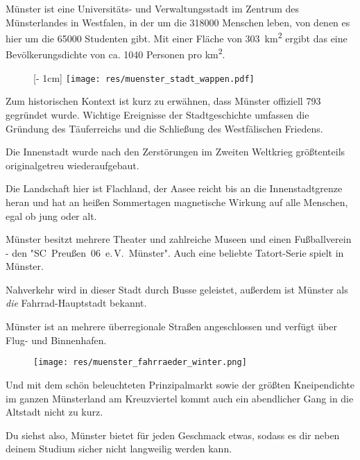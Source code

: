 \begin{multicols}{2}
Münster ist eine Universitäts- und Verwaltungsstadt im Zentrum des Münsterlandes in Westfalen, in der um die \num{318000} Menschen leben, von denen es hier um die \num{65000} Studenten gibt.
Mit einer Fläche von \SI{303}{\km\squared} ergibt das eine Bevölkerungsdichte von ca. \num{1040} Personen pro \si{\km\squared}.

\setlength{\intextsep}{0cm}
{%
\setlength{\columnsep}{2mm}
\begin{wrapfigure}[6]{r}[2mm]{0cm}
	\raisebox{0pt}[\dimexpr\height - 1cm\relax]{%
		\texttt{[image: res/muenster\_stadt\_wappen.pdf]}%
	}
\end{wrapfigure}
Zum historischen Kontext ist kurz zu erwähnen, dass Münster offiziell 793 gegründet wurde.
Wichtige Ereignisse der Stadtgeschichte umfassen die Gründung des Täuferreichs und die Schließung des Westfälischen Friedens.\par}

Die Innenstadt wurde nach den Zerstörungen im Zweiten Weltkrieg größtenteils originalgetreu wiederaufgebaut.

Die Landschaft hier ist Flachland, der Aasee reicht bis an die Innenstadtgrenze heran und hat an heißen Sommertagen magnetische Wirkung auf alle Menschen, egal ob jung oder alt.

Münster besitzt mehrere Theater und zahlreiche Museen und einen Fußballverein - den "SC~Preußen~06~e.\,V.~Münster".
Auch eine beliebte Tatort-Serie spielt in Münster.

Nahverkehr wird in dieser Stadt durch Busse geleistet, außerdem ist Münster als \textit{die} Fahrrad-Hauptstadt bekannt. 

Münster ist an mehrere überregionale Straßen angeschlossen und verfügt über Flug- und Binnenhafen.

\setlength{\columnsep}{2mm}
\begin{wrapfigure}[9]{l}[1mm]{0cm}
	\texttt{[image: res/muenster\_fahrraeder\_winter.png]}
\end{wrapfigure}
Und mit dem schön beleuchteten Prinzipalmarkt sowie der größten Kneipendichte im ganzen Münsterland am Kreuzviertel kommt auch ein abendlicher Gang in die Altstadt nicht zu kurz.

Du siehst also, Münster bietet für jeden Geschmack etwas, sodass es dir neben deinem Studium sicher nicht langweilig werden kann.

\begin{center}
	\large{}
\end{center}

\end{multicols}
